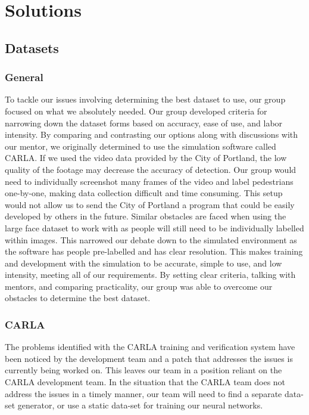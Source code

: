 \documentclass[onecolumn, draftclsnofoot,10pt, compsoc]{IEEEtran}
\begin{document}
\section{Solutions}
\subsection{Datasets}
\subsubsection{General}
To tackle our issues involving determining the best dataset to use, our group focused on what we absolutely needed. Our group developed criteria for narrowing down the dataset forms based on accuracy, ease of use, and labor intensity. By comparing and contrasting our options along with discussions with our mentor, we originally determined to use the simulation software called CARLA. If we used the video data provided by the City of Portland, the low quality of the footage may decrease the accuracy of detection. Our group would need to individually screenshot many frames of the video and label pedestrians one-by-one, making data collection difficult and time consuming. This setup would not allow us to send the City of Portland a program that could be easily developed by others in the future. Similar obstacles are faced when using the large face dataset to work with as people will still need to be individually labelled within images. This narrowed our debate down to the simulated environment as the software has people pre-labelled and has clear resolution. This makes training and development with the simulation to be accurate, simple to use, and low intensity, meeting all of our requirements. By setting clear criteria, talking with mentors, and comparing practicality, our group was able to overcome our obstacles to determine the best dataset.

\subsubsection{CARLA}
The problems identified with the CARLA training and verification system have been noticed by the development team and a patch that addresses the issues is currently being worked on. This leaves our team in a position reliant on the CARLA development team. In the situation that the CARLA team does not address the issues in a timely manner, our team will need to find a separate data-set generator, or use a static data-set for training our neural networks. 
\end{document}
